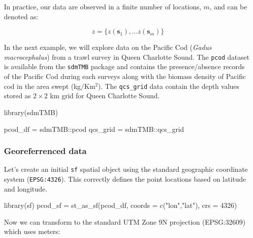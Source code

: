 \documentclass[
  letterpaper,
  DIV=11,
  numbers=noendperiod]{scrartcl}
\newenvironment{Shaded}{\begin{snugshade}}{\end{snugshade}}
\newcommand{\AttributeTok}[1]{\textcolor[rgb]{0.40,0.45,0.13}{#1}}
\newcommand{\DecValTok}[1]{\textcolor[rgb]{0.68,0.00,0.00}{#1}}
\newcommand{\FunctionTok}[1]{\textcolor[rgb]{0.28,0.35,0.67}{#1}}
\newcommand{\NormalTok}[1]{\textcolor[rgb]{0.00,0.23,0.31}{#1}}
\newcommand{\OtherTok}[1]{\textcolor[rgb]{0.00,0.23,0.31}{#1}}
\newcommand{\SpecialCharTok}[1]{\textcolor[rgb]{0.37,0.37,0.37}{#1}}
\newcommand{\StringTok}[1]{\textcolor[rgb]{0.13,0.47,0.30}{#1}}
\begin{document}
In practice, our data are observed in a finite number of locations,
\(m\), and can be denoted as:

\[z = \{z(\mathbf{s}_1), \ldots z(\mathbf{s}_m) \}\]

In the next example, we will explore data on the Pacific Cod
(\emph{Gadus macrocephalus}) from a trawl survey in Queen Charlotte
Sound. The \texttt{pcod} dataset is available from the \texttt{sdmTMB}
package and contains the presence/absence records of the Pacific Cod
during each surveys along with the biomass density of Pacific cod in the
area swept (kg/Km\(^2\)). The \texttt{qcs\_grid} data contain the depth
values stored as \(2\times 2\) km grid for Queen Charlotte Sound.

\begin{Shaded}
\begin{Highlighting}[]
\FunctionTok{library}\NormalTok{(sdmTMB)}

\NormalTok{pcod\_df }\OtherTok{=}\NormalTok{ sdmTMB}\SpecialCharTok{::}\NormalTok{pcod }
\NormalTok{qcs\_grid }\OtherTok{=}\NormalTok{ sdmTMB}\SpecialCharTok{::}\NormalTok{qcs\_grid}
\end{Highlighting}
\end{Shaded}

\subsubsection{Georeferrenced data}\label{georeferrenced-data}

Let's create an initial \texttt{sf} spatial object using the standard
geographic coordinate system (\texttt{EPSG:4326}). This correctly
defines the point locations based on latitude and longitude.

\begin{Shaded}
\begin{Highlighting}[]
\FunctionTok{library}\NormalTok{(sf)}
\NormalTok{pcod\_sf }\OtherTok{=}   \FunctionTok{st\_as\_sf}\NormalTok{(pcod\_df, }\AttributeTok{coords =} \FunctionTok{c}\NormalTok{(}\StringTok{"lon"}\NormalTok{,}\StringTok{"lat"}\NormalTok{), }\AttributeTok{crs =} \DecValTok{4326}\NormalTok{)}
\end{Highlighting}
\end{Shaded}

Now we can transform to the standard UTM Zone 9N projection (EPSG:32609)
which uses meters:

\begin{Shaded}
\end{Shaded}
\end{document}
